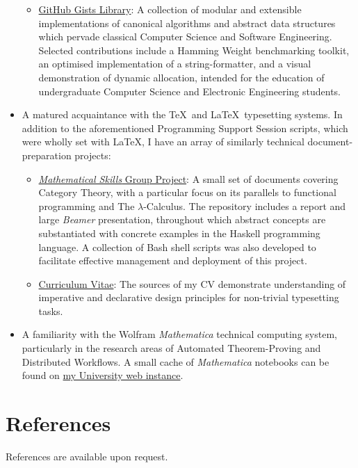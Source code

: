 \documentclass[final]{article}
\newcommand{\githublink}[2]{\href{https://github.com/oliverdixon/#1}{#2}}
\newcommand{\gistlink}[2]{\href{https://gist.github.com/oliverdixon/#1}{#2}}
\newcommand{\weblink}[2]{\href{https://www-users.york.ac.uk/~od641/#1}{#2}}
\begin{document}
\begin{itemize}
\begin{itemize}
                \item \gistlink{}{GitHub Gists Library}: A collection of modular
                and extensible implementations of canonical algorithms and
                abstract data structures which pervade classical Computer
                Science and Software Engineering. Selected contributions include
                a Hamming Weight benchmarking toolkit, an optimised
                implementation of a string-formatter, and a visual demonstration
                of dynamic allocation, intended for the education of
                undergraduate Computer Science and Electronic Engineering
                students.
        \end{itemize}
        \item A matured acquaintance with the \TeX\ and \LaTeX\ typesetting
        systems. In addition to the aforementioned Programming Support Session
        scripts, which were wholly set with \LaTeX, I have an array of similarly
        technical document-preparation projects:
        \begin{itemize}
                \item \githublink{MS1GP}{\textit{Mathematical Skills} Group
                Project}: A small set of documents covering Category Theory,
                with a particular focus on its parallels to functional
                programming and The $\lambda$-Calculus. The repository
                includes a report and large \textit{Beamer} presentation,
                throughout which abstract concepts are substantiated with
                concrete examples in the Haskell programming language. A
                collection of Bash shell scripts was also developed to
                facilitate effective management and deployment of this project.

                \item \githublink{cv}{Curriculum Vitae}: The sources of my CV
                demonstrate understanding of imperative and declarative design
                principles for non-trivial typesetting tasks.
        \end{itemize}
        \item A familiarity with the Wolfram \textit{Mathematica} technical
        computing system, particularly in the research areas of Automated
        Theorem-Proving and Distributed Workflows. A small cache of
        \textit{Mathematica} notebooks can be found on
        \weblink{misc\_mma}{my University web instance}.
\end{itemize}
%
%
\section{References}
References are available upon request.
%
\end{document}
